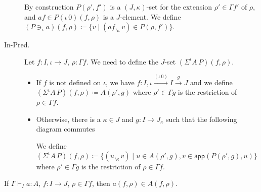 \documentclass{PaperTools/latex/llncs}
\newcommand\op[1]{∋_{#1}}
\newcommand\ip[3]{Σ^{#1} {#2}\,{#3}}
\def\app#1#2{\mathsf{app}(#1,#2)}
\begin{document}
\begin{description}

    By construction $P(ρ',f')$ is a $(J,κ)$-set for the extension $ρ' ∈ Γf'$ of $ρ$,
    and $af ∈ P(ι\,0)(f,ρ)$ is a $J$-element.
    We define $(P \op {ι} a)(f,ρ) ≔ \{ v \mid (af ,_κ v) ∈ P(ρ,f')\}$.

  \item[\sc In-Pred.]
    Let $f : I,ι → J$, $ρ : Γf$.  We need to define the $J$-set $(\ip {ι} A P)(f,ρ)$.

    \begin{itemize}
      \item If $f$ is not defined on $ι$, we have $f : I,ι \stackrel{(ι\,0)}{→} I \stackrel{g}{→} J$
        and we define $(\ip {ι} A P)(f,ρ) ≔ A(ρ',g)$
        where $ρ' ∈ Γg$ is the restriction of $ρ ∈ Γf$.

      \item Otherwise, there is a $κ ∈ J$ and $g : I → J_κ$ such that
        the following diagram commutes


        We define $(\ip {ι} A P)(f,ρ) ≔ \{ (u ,_κ v) \mid u ∈ A(ρ',g), v ∈ \app{P(ρ',g)}u\}$
        where $ρ' ∈ Γg$ is the restriction of $ρ ∈ Γf$.
    \end{itemize}
\end{description}

\begin{theorem}
  If $Γ ⊢_I a : A$, $f : I → J$, $ρ ∈ Γf$, then $a(f,ρ) ∈ A(f,ρ)$.
\end{theorem}
\end{document}
